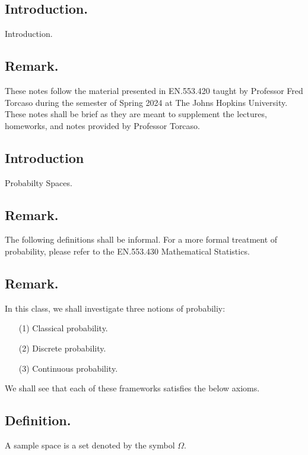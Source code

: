 \documentclass[titlepage]{article}
\begin{document}
\maketitle

\tableofcontents

\newpage {}

\subsection{Introduction.} Introduction.

\subsection{Remark.} These notes follow the material presented in EN.553.420 taught by Professor Fred Torcaso during the semester of Spring 2024 at The Johns Hopkins University. These notes shall be brief as they are meant to supplement the lectures, homeworks, and notes provided by Professor Torcaso.

\newpage {}

\subsection{Introduction} Probabilty Spaces.

\subsection{Remark.} The following definitions shall be informal. For a more formal treatment of probability, please refer to the EN.553.430 Mathematical Statistics.

\subsection{Remark.} In this class, we shall investigate three notions of probabiliy:
\begin{enumerate}
\item[(1)] Classical probability.
\item[(2)] Discrete probability.
\item[(3)] Continuous probability.
\end{enumerate}
We shall see that each of these frameworks satisfies the below axioms.

\subsection{Definition.} A sample space is a set denoted by the symbol $\Omega$.
\end{document}

